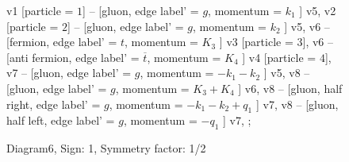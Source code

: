 \documentclass{revtex4}
\begin{document}
\begin{figure}[!htb]
\begin{center}
{    %
v1 [particle = \(1\)] -- [gluon, edge label' = \(g\), momentum = \(k_{1}\) ] v5, 
v2 [particle = \(2\)] -- [gluon, edge label' = \(g\), momentum = \(k_{2}\) ] v5, 
v6 -- [fermion, edge label' = \(t\), momentum = \(K_{3}\) ] v3 [particle = \(3\)], 
v6 -- [anti fermion, edge label' = \(\overline{t}\), momentum = \(K_{4}\) ] v4 [particle = \(4\)], 
v7 -- [gluon, edge label' = \(g\), momentum = \(-k_{1} - k_{2}\) ] v5, 
v8 -- [gluon, edge label' = \(g\), momentum = \(K_{3} + K_{4}\) ] v6, 
v8 -- [gluon, half right, edge label' = \(g\), momentum = \(-k_{1} - k_{2} + q_{1}\) ] v7, 
v8 -- [gluon, half left, edge label' = \(g\), momentum = \(-q_{1}\) ] v7, 
};
\end{center}
\caption{Diagram6, Sign: 1, Symmetry factor: 1/2}
\end{figure}
\newpage
\end{document}
